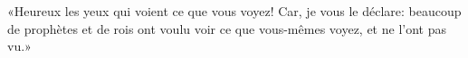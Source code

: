 \encetemps \jesusdisciples
	«Heureux les yeux qui voient ce que vous voyez!
	Car, je vous le déclare:
	beaucoup de prophètes et de rois ont voulu voir ce que vous-mêmes voyez,
	et ne l’ont pas vu.»
